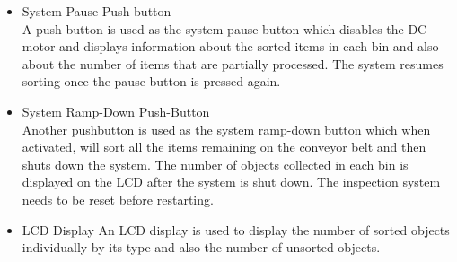 \begin{itemize}
\item System Pause Push-button\\
A push-button is used as the system pause button which disables the DC motor and displays information about the sorted items in each bin and also about the number of items that are partially processed.  The system resumes sorting once the pause button is pressed again.

\item System Ramp-Down Push-Button\\
Another pushbutton is used as the system ramp-down button which when activated, will sort all the items remaining on the conveyor belt and then shuts down the system. The number of objects collected in each bin is displayed on the LCD after the system is shut down. The inspection system needs to be reset before restarting.

\item LCD Display
An LCD display is used to display the number of sorted objects individually by its type and also the number of unsorted objects.
\end{itemize}